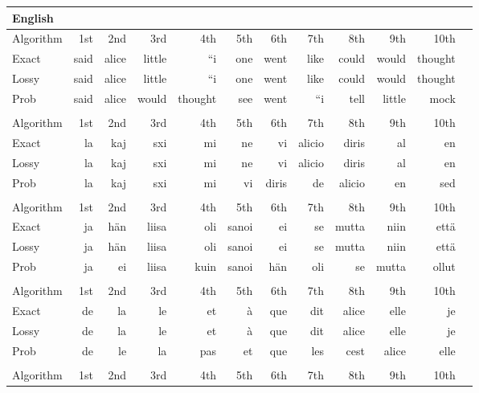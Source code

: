 \documentclass{article}
\begin{document}
\begin{longtable}{lrrrrrrrrrrr}
\multicolumn{12}{l}{\textbf{English}} \\
\toprule
Algorithm & 1st & 2nd & 3rd & 4th & 5th & 6th & 7th & 8th & 9th & 10th \\\midrule
Exact & said & alice & little & “i & one & went & like & could & would & thought \\
Lossy & said & alice & little & “i & one & went & like & could & would & thought \\
Prob & said & alice & would & thought & see & went & “i & tell & little & mock \\
\bottomrule
\addlinespace[1em]
\multicolumn{12}{l}{\textbf{Esperanto}} \\
\toprule
Algorithm & 1st & 2nd & 3rd & 4th & 5th & 6th & 7th & 8th & 9th & 10th \\\midrule
Exact & la & kaj & sxi & mi & ne & vi & alicio & diris & al & en \\
Lossy & la & kaj & sxi & mi & ne & vi & alicio & diris & al & en \\
Prob & la & kaj & sxi & mi & vi & diris & de & alicio & en & sed \\
\bottomrule
\addlinespace[1em]
\multicolumn{12}{l}{\textbf{Finnish}} \\
\toprule
Algorithm & 1st & 2nd & 3rd & 4th & 5th & 6th & 7th & 8th & 9th & 10th \\\midrule
Exact & ja & hän & liisa & oli & sanoi & ei & se & mutta & niin & että \\
Lossy & ja & hän & liisa & oli & sanoi & ei & se & mutta & niin & että \\
Prob & ja & ei & liisa & kuin & sanoi & hän & oli & se & mutta & ollut \\
\bottomrule
\addlinespace[1em]
\multicolumn{12}{l}{\textbf{French}} \\
\toprule
Algorithm & 1st & 2nd & 3rd & 4th & 5th & 6th & 7th & 8th & 9th & 10th \\\midrule
Exact & de & la & le & et & à & que & dit & alice & elle & je \\
Lossy & de & la & le & et & à & que & dit & alice & elle & je \\
Prob & de & le & la & pas & et & que & les & cest & alice & elle \\
\bottomrule
\addlinespace[1em]
\multicolumn{12}{l}{\textbf{German}} \\
\toprule
Algorithm & 1st & 2nd & 3rd & 4th & 5th & 6th & 7th & 8th & 9th & 10th \\\midrule

\end{longtable}
\end{document}
